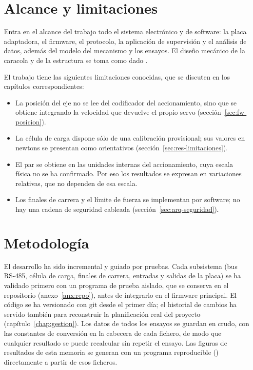 \section{Alcance y limitaciones}

Entra en el alcance del trabajo todo el sistema electrónico y de software: la placa adaptadora, el
firmware, el protocolo, la aplicación de supervisión y el análisis de datos, además del modelo del
mecanismo y los ensayos. El diseño mecánico de la caracola y de la estructura se toma como dado
.

El trabajo tiene las siguientes limitaciones conocidas, que se discuten en los capítulos
correspondientes:
\begin{itemize}
  \item La posición del eje no se lee del codificador del accionamiento, sino que se obtiene
        integrando la velocidad que devuelve el propio servo (sección~\ref{sec:fw-posicion}).
  \item La célula de carga dispone sólo de una calibración provisional; sus valores en newtons se
        presentan como orientativos (sección~\ref{sec:res-limitaciones}).
  \item El par se obtiene en las unidades internas del accionamiento, cuya escala física no se ha
        confirmado. Por eso los resultados se expresan en variaciones relativas, que no dependen de
        esa escala.
  \item Los finales de carrera y el límite de fuerza se implementan por software; no hay una
        cadena de seguridad cableada (sección~\ref{sec:arq-seguridad}).
\end{itemize}

\section{Metodología}

El desarrollo ha sido incremental y guiado por pruebas. Cada subsistema (bus RS-485, célula de
carga, finales de carrera, entradas y salidas de la placa) se ha validado primero con un programa
de prueba aislado, que se conserva en el repositorio (anexo~\ref{anx:repo}), antes de integrarlo
en el firmware principal. El código se ha versionado con git desde el primer día; el historial de
cambios ha servido también para reconstruir la planificación real del proyecto
(capítulo~\ref{chap:gestion}). Los datos de todos los ensayos se guardan en crudo, con las
constantes de conversión en la cabecera de cada fichero, de modo que cualquier resultado se puede
recalcular sin repetir el ensayo. Las figuras de resultados de esta memoria se generan con un
programa reproducible () directamente a partir de esos
ficheros.

